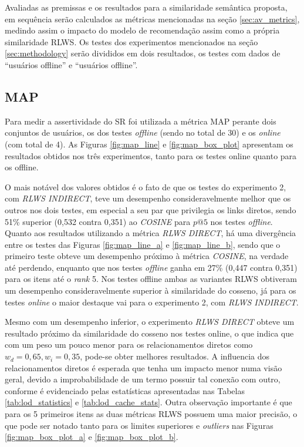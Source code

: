 Avaliadas as premissas e os resultados para a similaridade semântica proposta, em sequência serão calculados as métricas mencionadas na seção \ref{sec:av_metrics}, medindo assim o impacto do modelo de recomendação assim como a própria similaridade \ac{RLWS}. Os testes dos experimentos mencionados na seção \ref{sec:methodology} serão divididos em dois resultados, os testes com dados de \enquote{usuários offline} e \enquote{usuários offline}.

\subsection{MAP}

Para medir a assertividade do \ac{SR} foi utilizada a métrica \ac{MAP} perante dois conjuntos de usuários, os dos testes \textit{offline} (sendo no total de 30) e os \textit{online} (com total de 4). As Figuras \ref{fig:map_line} e \ref{fig:map_box_plot} apresentam os resultados obtidos nos três experimentos, tanto para os testes online quanto para os offline. 

O mais notável dos valores obtidos é o fato de que os testes do experimento 2, com \textit{RLWS INDIRECT}, teve um desempenho consideravelmente melhor que os outros nos dois testes, em especial a seu par que privilegia os links diretos, sendo 51\% superior (0,532 contra 0,351) ao \textit{COSINE} para $p@5$ nos testes \textit{offline}. Quanto aos resultados utilizando a métrica \textit{RLWS DIRECT}, há uma divergência entre os testes das Figuras \ref{fig:map_line_a} e \ref{fig:map_line_b}, sendo que o primeiro teste obteve um desempenho próximo à métrica \textit{COSINE}, na verdade até perdendo, enquanto que nos testes \textit{offline} ganha em 27\% (0,447 contra 0,351) para os itens até o \textit{rank} 5. Nos testes offline ambas as variantes \ac{RLWS} obtiveram um desempenho consideravelmente superior à similaridade do cosseno, já para os testes \textit{online} o maior destaque vai para o experimento 2, com \textit{RLWS INDIRECT}.

Mesmo com um desempenho inferior, o experimento \textit{RLWS DIRECT} obteve um resultado próximo da similaridade do cosseno nos testes online, o que indica que com um peso um pouco menor para os relacionamentos diretos como $w_d = 0,65, w_i = 0,35$, pode-se obter melhores resultados. A influencia dos relacionamentos diretos é esperada que tenha um impacto menor numa visão geral, devido a improbabilidade de um termo possuir tal conexão com outro, conforme é evidenciado pelas estatísticas apresentadas nas Tabelas \ref{tab:lod_statistics} e \ref{tab:lod_cache_stats}. Outra observação importante é que para os 5 primeiros itens as duas métricas \ac{RLWS} possuem uma maior precisão, o que pode ser notado tanto para os limites superiores e \textit{outliers} nas Figuras \ref{fig:map_box_plot_a} e \ref{fig:map_box_plot_b}.

